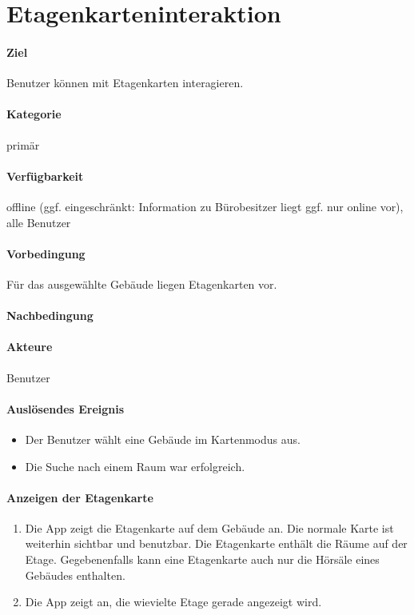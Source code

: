 \section{Etagenkarteninteraktion}
\paragraph{Ziel}
Benutzer können mit Etagenkarten interagieren.
\paragraph{Kategorie}
primär
\paragraph{Verfügbarkeit}
offline (ggf. eingeschränkt: Information zu Bürobesitzer liegt ggf. nur online vor), alle Benutzer
\paragraph{Vorbedingung}
Für das ausgewählte Gebäude liegen Etagenkarten vor.
\paragraph{Nachbedingung}

\paragraph{Akteure}
Benutzer
\paragraph{Auslösendes Ereignis}
\begin{itemize}
    \item Der Benutzer wählt eine Gebäude im Kartenmodus aus.
    \item Die Suche nach einem Raum war erfolgreich.
\end{itemize}
 
\paragraph{Anzeigen der Etagenkarte}
\begin{enumerate}
    \item Die App zeigt die Etagenkarte auf dem Gebäude an. Die normale Karte ist weiterhin sichtbar und benutzbar. Die Etagenkarte enthält die Räume auf der Etage. Gegebenenfalls kann eine Etagenkarte auch nur die Hörsäle eines Gebäudes enthalten.
    \item Die App zeigt an, die wievielte Etage gerade angezeigt wird.
\end{enumerate}
